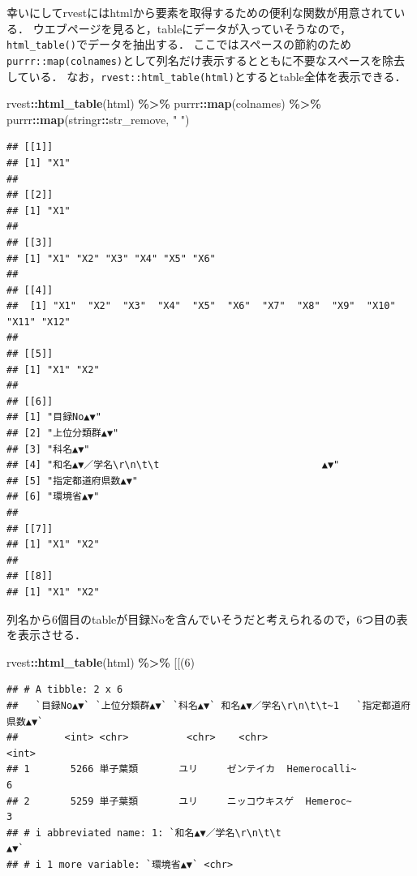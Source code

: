 \documentclass[
]{article}
\newenvironment{Shaded}{\begin{snugshade}}{\end{snugshade}}
\newcommand{\AttributeTok}[1]{\textcolor[rgb]{0.13,0.29,0.53}{#1}}
\newcommand{\DecValTok}[1]{\textcolor[rgb]{0.00,0.00,0.81}{#1}}
\newcommand{\FunctionTok}[1]{\textcolor[rgb]{0.13,0.29,0.53}{\textbf{#1}}}
\newcommand{\NormalTok}[1]{#1}
\newcommand{\SpecialCharTok}[1]{\textcolor[rgb]{0.81,0.36,0.00}{\textbf{#1}}}
\newcommand{\StringTok}[1]{\textcolor[rgb]{0.31,0.60,0.02}{#1}}
\begin{document}
幸いにしてrvestにはhtmlから要素を取得するための便利な関数が用意されている．
ウエブページを見ると，tableにデータが入っていそうなので，\texttt{html\_table()}でデータを抽出する．
ここではスペースの節約のため\texttt{purrr::map(colnames)}として列名だけ表示するとともに不要なスペースを除去している．
なお，\texttt{rvest::html\_table(html)}とするとtable全体を表示できる．

\begin{Shaded}
\begin{Highlighting}[]
\NormalTok{rvest}\SpecialCharTok{::}\FunctionTok{html\_table}\NormalTok{(html) }\SpecialCharTok{\%\textgreater{}\%}
\NormalTok{  purrr}\SpecialCharTok{::}\FunctionTok{map}\NormalTok{(colnames) }\SpecialCharTok{\%\textgreater{}\%}
\NormalTok{  purrr}\SpecialCharTok{::}\FunctionTok{map}\NormalTok{(stringr}\SpecialCharTok{::}\NormalTok{str\_remove, }\StringTok{" "}\NormalTok{)}
\end{Highlighting}
\end{Shaded}

\begin{verbatim}
## [[1]]
## [1] "X1"
## 
## [[2]]
## [1] "X1"
## 
## [[3]]
## [1] "X1" "X2" "X3" "X4" "X5" "X6"
## 
## [[4]]
##  [1] "X1"  "X2"  "X3"  "X4"  "X5"  "X6"  "X7"  "X8"  "X9"  "X10" "X11" "X12"
## 
## [[5]]
## [1] "X1" "X2"
## 
## [[6]]
## [1] "目録No▲▼"                                            
## [2] "上位分類群▲▼"                                        
## [3] "科名▲▼"                                              
## [4] "和名▲▼／学名\r\n\t\t                            ▲▼"
## [5] "指定都道府県数▲▼"                                    
## [6] "環境省▲▼"                                            
## 
## [[7]]
## [1] "X1" "X2"
## 
## [[8]]
## [1] "X1" "X2"
\end{verbatim}

列名から6個目のtableが目録Noを含んでいそうだと考えられるので，6つ目の表を表示させる．

\begin{Shaded}
\begin{Highlighting}[]
\NormalTok{rvest}\SpecialCharTok{::}\FunctionTok{html\_table}\NormalTok{(html) }\SpecialCharTok{\%\textgreater{}\%}
  \StringTok{\textasciigrave{}}\AttributeTok{[[}\StringTok{\textasciigrave{}}\NormalTok{(}\DecValTok{6}\NormalTok{)}
\end{Highlighting}
\end{Shaded}

\begin{verbatim}
## # A tibble: 2 x 6
##   `目録No▲▼` `上位分類群▲▼` `科名▲▼` 和名▲▼／学名\r\n\t\t~1   `指定都道府県数▲▼`
##        <int> <chr>          <chr>    <chr>                                 <int>
## 1       5266 単子葉類       ユリ     ゼンテイカ  Hemerocalli~                  6
## 2       5259 単子葉類       ユリ     ニッコウキスゲ  Hemeroc~                  3
## # i abbreviated name: 1: `和名▲▼／学名\r\n\t\t                             ▲▼`
## # i 1 more variable: `環境省▲▼` <chr>
\end{verbatim}
\end{document}
